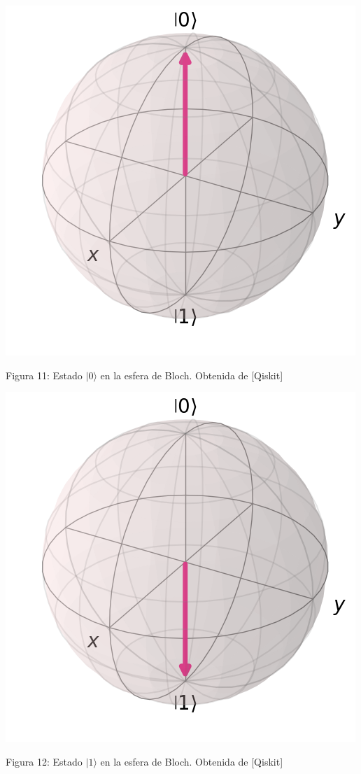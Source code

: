 \documentclass{article}
\numberwithin{equation}{section} %
\begin{document}
    \begin{minipage}{0.1\textwidth}
        \hfill
    \end{minipage}
    \begin{minipage}{0.3\textwidth}
        \centering
        \includegraphics[width=\textwidth]{img/Bloch/bloch_state_0.png}
        \caption{Figura 11: Estado $|0\rangle$ en la esfera de Bloch. Obtenida de [Qiskit]}
    \end{minipage}
    \hfill
    \hfill
    \begin{minipage}{0.3\textwidth}
        \centering
        \includegraphics[width=\textwidth]{img/Bloch/bloch_state_1.png}
        \caption{Figura 12: Estado $|1\rangle$ en la esfera de Bloch. Obtenida de [Qiskit]}
    \end{minipage}
\end{document}
